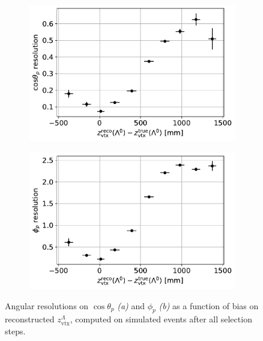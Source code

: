 \begin{figure}[t]
	\centering
	\begin{subfigure}{.45\textwidth}
		\includegraphics[width=\textwidth]{graphics/05-angular_distributions/MCRECO_p_theta_resolution_vs_L_endvertex_z_bias.pdf}
		\caption{}
		\label{fig:5:theta_resolution_vs_vertex_bias}
	\end{subfigure}
	\begin{subfigure}{.45\textwidth}
		\includegraphics[width=\textwidth]{graphics/05-angular_distributions/MCRECO_p_phi_resolution_vs_L_endvertex_z_bias.pdf}
		\caption{}
		\label{fig:5:phi_resolution_vs_vertex_bias}
	\end{subfigure}
	\caption{Angular resolutions on $\cos\theta_p$ \textit{(a)} and $\phi_p$ \textit{(b)} as a function of bias on reconstructed $z_\text{vtx}^\Lambda$, computed on simulated \demonstratorshort events after all selection steps.}
	\label{fig:5:angular_resolution_vs_vertex_bias}
\end{figure}

